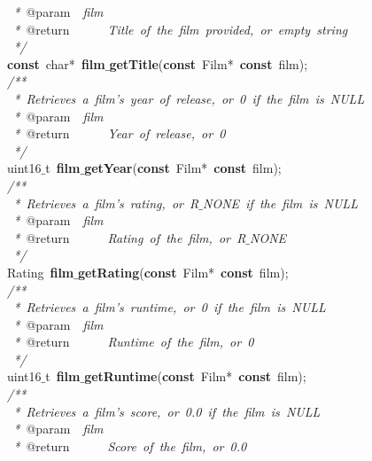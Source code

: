 \documentclass{article}
\begin{document}
\mbox{}\textit{\ *\ }@param\textit{\ \ film} \\
\mbox{}\textit{\ *\ }@return\textit{\ \ \ \ \ \ Title\ of\ the\ film\ provided,\ or\ empty\ string} \\
\mbox{}\textit{\ */} \\
\mbox{}\textbf{const}\ char*\ \textbf{film$\_$getTitle}(\textbf{const}\ Film*\ \textbf{const}\ film); \\
\mbox{}\textit{/**} \\
\mbox{}\textit{\ *\ Retrieves\ a\ film's\ year\ of\ release,\ or\ 0\ if\ the\ film\ is\ NULL} \\
\mbox{}\textit{\ *\ }@param\textit{\ \ film} \\
\mbox{}\textit{\ *\ }@return\textit{\ \ \ \ \ \ Year\ of\ release,\ or\ 0} \\
\mbox{}\textit{\ */} \\
\mbox{}uint16$\_$t\ \textbf{film$\_$getYear}(\textbf{const}\ Film*\ \textbf{const}\ film); \\
\mbox{}\textit{/**} \\
\mbox{}\textit{\ *\ Retrieves\ a\ film's\ rating,\ or\ R$\_$NONE\ if\ the\ film\ is\ NULL} \\
\mbox{}\textit{\ *\ }@param\textit{\ \ film} \\
\mbox{}\textit{\ *\ }@return\textit{\ \ \ \ \ \ Rating\ of\ the\ film,\ or\ R$\_$NONE} \\
\mbox{}\textit{\ */} \\
\mbox{}Rating\ \textbf{film$\_$getRating}(\textbf{const}\ Film*\ \textbf{const}\ film); \\
\mbox{}\textit{/**} \\
\mbox{}\textit{\ *\ Retrieves\ a\ film's\ runtime,\ or\ 0\ if\ the\ film\ is\ NULL} \\
\mbox{}\textit{\ *\ }@param\textit{\ \ film} \\
\mbox{}\textit{\ *\ }@return\textit{\ \ \ \ \ \ Runtime\ of\ the\ film,\ or\ 0} \\
\mbox{}\textit{\ */} \\
\mbox{}uint16$\_$t\ \textbf{film$\_$getRuntime}(\textbf{const}\ Film*\ \textbf{const}\ film); \\
\mbox{}\textit{/**} \\
\mbox{}\textit{\ *\ Retrieves\ a\ film's\ score,\ or\ 0.0\ if\ the\ film\ is\ NULL} \\
\mbox{}\textit{\ *\ }@param\textit{\ \ film} \\
\mbox{}\textit{\ *\ }@return\textit{\ \ \ \ \ \ Score\ of\ the\ film,\ or\ 0.0} \\
\end{document}
